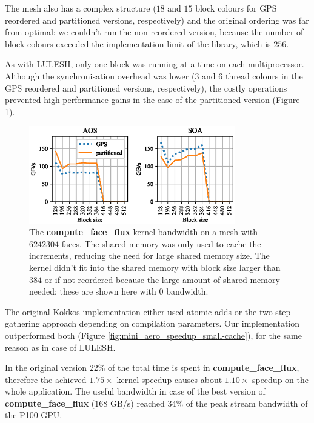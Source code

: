 The mesh also has a complex structure ($18$ and $15$ block colours for GPS
reordered and partitioned versions, respectively) and the original ordering was
far from optimal: we couldn't run the non-reordered version, because the number
of block colours exceeded the implementation limit of the library, which is
$256$.

As with LULESH, only one block was running at a time on each multiprocessor.
Although the synchronisation overhead was lower ($3$ and $6$ thread
colours in the GPS reordered and partitioned versions, respectively), the costly
operations prevented high performance gains in the case of the partitioned
version (Figure \ref{fig:mini_aero_bw_small-cache}).

\begin{figure}[Htbp]
  \centering
  \includegraphics[width=9cm]{fig/mini_aero_bw_small-cache.eps}
  \caption{The \textbf{compute\_face\_flux} kernel bandwidth on a mesh with
  $6242304$ faces. The shared memory was only used to cache the increments,
  reducing the need for large shared memory size. The kernel didn't fit into the
  shared memory with block size larger than $384$ or if not reordered because
  the large amount of shared memory needed; these are shown here with $0$
  bandwidth.}
  \label{fig:mini_aero_bw_small-cache}
\end{figure}

The original Kokkos implementation either used atomic adds or the two-step
gathering approach depending on compilation parameters. Our implementation
outperformed both (Figure \ref{fig:mini_aero_speedup_small-cache}), for the same
reason as in case of LULESH.

In the original version $22\%$ of the total time is spent in
\textbf{compute\_face\_flux}, therefore the achieved $1.75\times$ kernel speedup
causes about $1.10\times$ speedup on the whole application. The useful bandwidth
in case of the best version of \textbf{compute\_face\_flux} ($168$ GB/s) reached
$34\%$ of the peak stream bandwidth of the P100 GPU.

